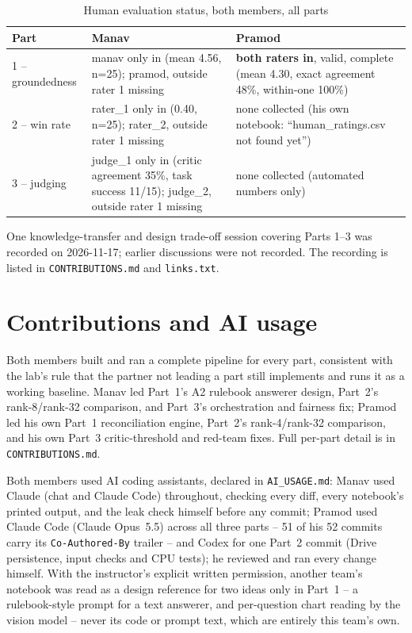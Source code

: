 \documentclass[conference,10pt]{IEEEtran}
\begin{document}
\begin{table}[t]
\caption{Human evaluation status, both members, all parts}
\label{tab:human-status}
\centering\small
\begin{tabular}{p{1.3cm}p{7.5cm}p{7.5cm}}
\toprule
Part & Manav & Pramod \\
\midrule
1 -- groundedness & manav only in (mean 4.56, n=25); pramod, outside rater 1 missing & \textbf{both raters in}, valid, complete (mean 4.30, exact agreement 48\%, within-one 100\%) \\
2 -- win rate & rater\_1 only in (0.40, n=25); rater\_2, outside rater 1 missing & none collected (his own notebook: ``human\_ratings.csv not found yet'') \\
3 -- judging & judge\_1 only in (critic agreement 35\%, task success 11/15); judge\_2, outside rater 1 missing & none collected (automated numbers only) \\
\bottomrule
\end{tabular}
\end{table}

One knowledge-transfer and design trade-off session covering Parts 1--3 was recorded on 2026-11-17; earlier discussions were not recorded. The recording is listed in \texttt{CONTRIBUTIONS.md} and \texttt{links.txt}.

\section{Contributions and AI usage}
\label{sec:contrib}

Both members built and ran a complete pipeline for every part, consistent with the lab's rule that
the partner not leading a part still implements and runs it as a working baseline. Manav led Part~1's
A2 rulebook answerer design, Part~2's rank-8/rank-32 comparison, and Part~3's orchestration and
fairness fix; Pramod led his own Part~1 reconciliation engine, Part~2's rank-4/rank-32 comparison,
and his own Part~3 critic-threshold and red-team fixes. Full per-part detail is in
\texttt{CONTRIBUTIONS.md}.

Both members used AI coding assistants, declared in \texttt{AI\_USAGE.md}: Manav used Claude (chat
and Claude Code) throughout, checking every diff, every notebook's printed output, and the leak check
himself before any commit; Pramod used Claude Code (Claude Opus~5.5) across all three parts -- 51 of his 52 commits carry its
\texttt{Co-Authored-By} trailer -- and Codex for one Part~2 commit (Drive persistence, input checks and
CPU tests); he reviewed and ran every change himself. With the instructor's explicit written permission, another team's
notebook was read as a design reference for two ideas only in Part~1 -- a rulebook-style prompt for a
text answerer, and per-question chart reading by the vision model -- never its code or prompt text,
which are entirely this team's own.
\end{document}
